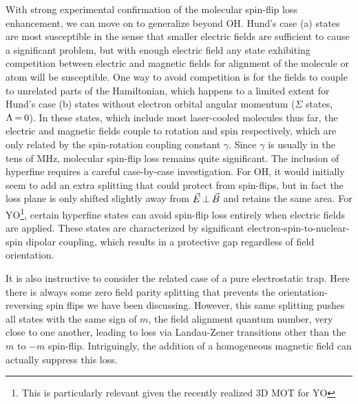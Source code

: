 \documentclass[%
 reprint,
 amsmath,amssymb,
 aps,
prl,
]{revtex4-1}
\newcommand{\epb}{{$\vec{E}\s {\perp}\s\vec{B}$}}
\newcommand{\s}{{\nobreak\hspace{.2em}}}
\begin{document}
With strong experimental confirmation of the molecular spin-flip loss enhancement, we can move on to generalize beyond OH.
Hund's case (a) states are most susceptible in the sense that smaller electric fields are sufficient to cause a significant problem, but with enough electric field any state exhibiting competition between electric and magnetic fields for alignment of the molecule or atom will be susceptible. 
One way to avoid competition is for the fields to couple to unrelated parts of the Hamiltonian, which happens to a limited extent for Hund's case (b) states without electron orbital angular momentum ($\Sigma$ states, $\Lambda\s {=}\s 0$)\s\cite{Bohn2013}. 
In these states, which include most laser-cooled molecules thus far, the electric and magnetic fields couple to rotation and spin respectively, which are only related by the spin-rotation coupling constant $\gamma$.
Since $\gamma$ is usually in the tens of MHz\s\cite{Quemener2016}, molecular spin-flip loss remains quite significant.
The inclusion of hyperfine requires a careful case-by-case investigation. For OH, it would initially seem to add an extra splitting that could protect from spin-flips, but in fact the loss plane is only shifted slightly away from \epb{} and retains the same area.
For YO\s\footnote{This is particularly relevant given the recently realized 3D MOT for YO}, certain hyperfine states can avoid spin-flip loss entirely when electric fields are applied. 
These states are characterized by significant electron-spin-to-nuclear-spin dipolar coupling, which results in a protective gap regardless of field orientation. %

It is also instructive to consider the related case of a pure electrostatic trap. 
Here there is always some zero field parity splitting that prevents the orientation-reversing spin flips we have been discussing.
However, this same splitting pushes all states with the same sign of $m$, the field alignment quantum number, very close to one another, leading to loss via Landau-Zener transitions other than the $m$ to $-m$ spin-flip\s\cite{Wall2010}.
Intriguingly, the addition of a homogeneous magnetic field can actually suppress this loss\s\cite{Meek2011}.
\end{document}
